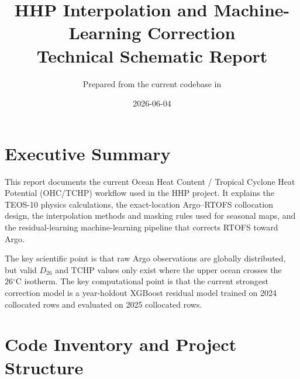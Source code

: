 \documentclass[11pt]{report}
\title{HHP Interpolation and Machine-Learning Correction\\Technical Schematic Report}
\author{Prepared from the current codebase in \code{/home/suramya/HHP-Prediction/OHC}}
\date{2026-06-04}
\newcommand{\celsius}{\ensuremath{^{\circ}\mathrm{C}}}
\newcommand{\TCHP}{\ensuremath{\mathrm{TCHP}}}
\newcommand{\Dtwentysix}{\ensuremath{D_{26}}}
\begin{document}
\maketitle
\tableofcontents

\chapter*{Executive Summary}
This report documents the current Ocean Heat Content / Tropical Cyclone Heat Potential (OHC/TCHP) workflow used in the HHP project. It explains the TEOS-10 physics calculations, the exact-location Argo--RTOFS collocation design, the interpolation methods and masking rules used for seasonal maps, and the residual-learning machine-learning pipeline that corrects RTOFS toward Argo.

The key scientific point is that raw Argo observations are globally distributed, but valid \Dtwentysix{} and \TCHP{} values only exist where the upper ocean crosses the \(26\celsius{}\) isotherm. The key computational point is that the current strongest correction model is a year-holdout XGBoost residual model trained on 2024 collocated rows and evaluated on 2025 collocated rows.

\chapter{Code Inventory and Project Structure}
\end{document}
